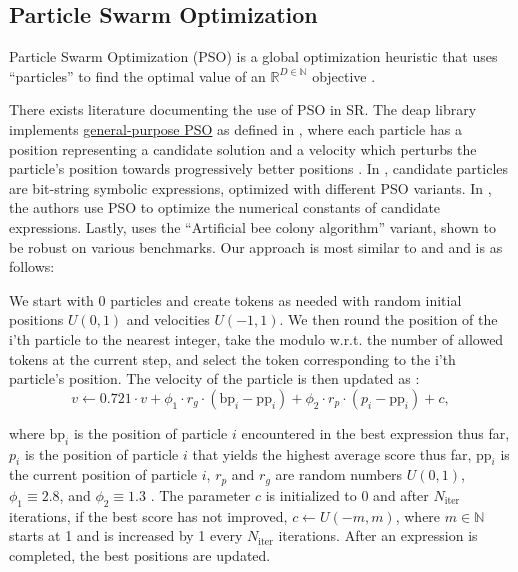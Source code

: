 \documentclass[runningheads]{llncs}
\begin{document}
\subsection{Particle Swarm Optimization} \label{subsec:ParticleSwarmOptimization}
Particle Swarm Optimization (PSO) is a global optimization heuristic that uses ``particles'' to find the optimal value of an $\mathbb{R}^{D\in\mathbb{N}}$ objective  \cite{clerc:hal-00764996}.
\par There exists literature documenting the use of PSO in SR. The deap library implements \href{https://github.com/DEAP/deap/blob/60913c5543abf8318ddce0492e8ffcdf37974d86/examples/pso/basic.py}{general-purpose PSO} as defined in \cite{PoliOverviewPSO}, where each particle has a position representing a candidate solution and a velocity which perturbs the particle's position towards progressively better positions \cite{DEAP_JMLR2012}. In \cite{10.1007/978-3-319-70093-9_37}, candidate particles are bit-string symbolic expressions, optimized with different PSO variants. In \cite{Lu2021}, the authors use PSO to optimize the numerical constants of candidate expressions. Lastly, \cite{KARABOGA20121} uses the ``Artificial bee colony algorithm'' variant, shown to be robust on various benchmarks. Our approach is most similar to \cite{DEAP_JMLR2012} and \cite{10.1007/978-3-319-70093-9_37} and is as follows:
\par We start with 0 particles and create tokens as needed with random initial positions $U(0,1)$ and velocities $U(-1,1)$. We then round the position of the i'th particle to the nearest integer, take the modulo w.r.t. the number of allowed tokens at the current step, and select the token corresponding to the i'th particle's position. The velocity of the particle is then updated as \cite{clerc:hal-00764996} \cite{offShellPSO}:
\begin{equation}
		v \gets 0.721\cdot v + \phi_1 \cdot r_g \cdot (\mathrm{bp}_i - \mathrm{pp}_i) + \phi_2\cdot r_p \cdot (p_i - \mathrm{pp}_i) + c,
\end{equation}

where $\mathrm{bp}_i$ is the position of particle $i$ encountered in the best expression thus far, $p_i$ is the position of particle $i$ that yields the highest average score thus far, $\mathrm{pp}_i$ is the current position of particle $i$, $r_p$ and $r_g$ are random numbers $U(0,1)$, $\phi_1 \equiv 2.8$, and $\phi_2 \equiv 1.3$  \cite{offShellPSO}. The parameter $c$ is initialized to 0 and after $N_{\mathrm{iter}}$ iterations, if the best score has not improved, $c \gets U(-m, m)$, where $m \in \mathbb{N}$ starts at 1 and is increased by 1 every $N_{\mathrm{iter}}$ iterations. After an expression is completed, the best positions are updated. 
\end{document}
